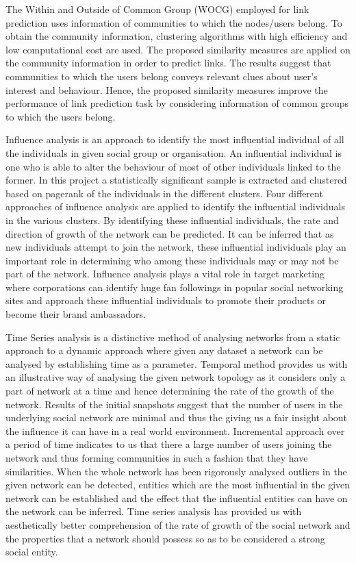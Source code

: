The Within and Outside of Common Group (WOCG) employed for link prediction uses information of communities to which the nodes/users belong. To obtain the community information, clustering algorithms with high efficiency and low computational cost are used. The proposed similarity measures are applied on the community information in order to predict links.
The results suggest that communities to which the users belong conveys relevant clues about user's interest and behaviour. Hence, the proposed similarity measures improve the performance of link prediction task by considering information of common groups to which the users belong.

Influence analysis is an approach to identify the most influential individual of all the individuals in given social group or organisation. An influential individual is one who is able to alter the behaviour of most of other individuals linked to the former. In this project a statistically significant sample is extracted and clustered based on pagerank of the individuals in the different clusters. Four different approaches of influence analysis are applied to identify the influential individuals in the various clusters. By identifying these influential individuals, the rate and direction of growth of the network can be predicted. It can be inferred that as new individuals attempt to join the network, these influential individuals play an important role in determining who among these individuals may or may not be part of the network. Influence analysis plays a vital role in target marketing where corporations can identify huge fan followings in popular social networking sites and approach these influential individuals to promote their products or become their brand ambassadors.

Time Series analysis is a distinctive method of analysing networks from a static approach to a dynamic approach where given any dataset a network can be analysed by establishing time as a parameter. Temporal method provides us with an illustrative way of analysing the given network topology as it considers only a part of network at a time and hence determining the rate of the growth of the network. Results of the initial snapshots suggest that the number of users in the underlying social network are minimal and thus the giving us a fair insight about the influence it can have in a real world environment. Incremental approach over a period of time indicates to us that there a large number of users joining the network and thus forming communities in such a fashion that they have similarities. When the whole network has been rigorously analysed outliers in the given network can be detected, entities which are the most influential in the given network can be established and the effect that the influential entities can have on the network can be inferred. Time series analysis has provided us with aesthetically better comprehension of the rate of growth of the social network and the properties that a network should possess so as to be considered a strong social entity.


